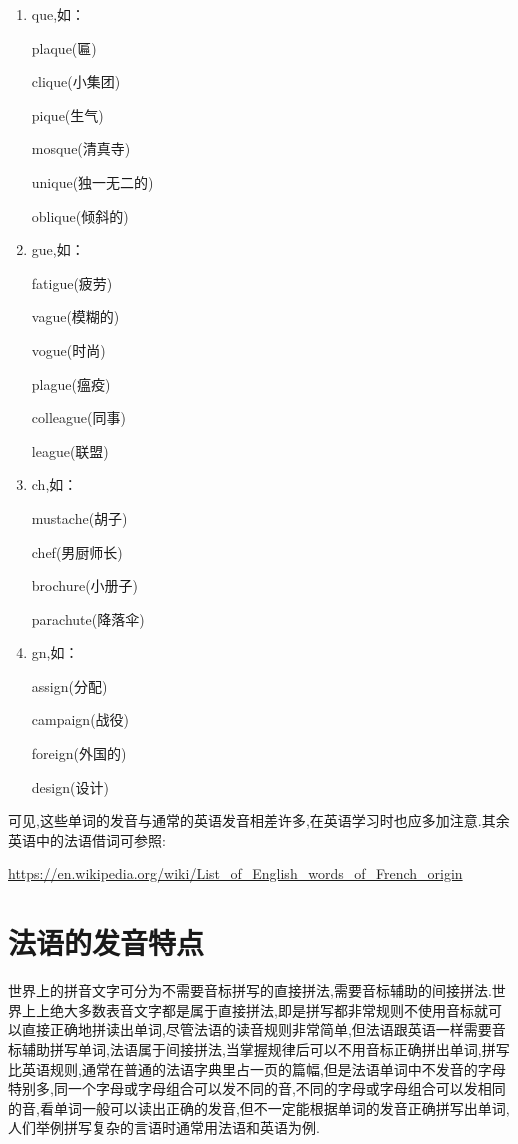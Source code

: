 \begin{multicols}{3}
\begin{enumerate}
		\item que,如：
		
		plaque(匾)

		clique(小集团)
		
		pique(生气)
		
		mosque(清真寺)
		
		unique(独一无二的)
		
		oblique(倾斜的)
		
		\item gue,如：
		
		fatigue(疲劳)

		vague(模糊的)
		
		vogue(时尚)
		
		plague(瘟疫)
		
		colleague(同事)
		
		league(联盟)
		
		\item ch,如：
		
		mustache(胡子)

		chef(男厨师长)
		
		brochure(小册子)
		
		parachute(降落伞)
		
		\item gn,如：
		
		assign(分配)

		campaign(战役)
		
		foreign(外国的)
		
		design(设计)
	\end{enumerate}
\end{multicols}
	
可见,这些单词的发音与通常的英语发音相差许多,在英语学习时也应多加注意.其余英语中的法语借词可参照:

\url{https://en.wikipedia.org/wiki/List_of_English_words_of_French_origin}

\section{法语的发音特点}

世界上的拼音文字可分为不需要音标拼写的直接拼法,需要音标辅助的间接拼法.世界上上绝大多数表音文字都是属于直接拼法,即是拼写都非常规则不使用音标就可以直接正确地拼读出单词,尽管法语的读音规则非常简单,但法语跟英语一样需要音标辅助拼写单词,法语属于间接拼法,当掌握规律后可以不用音标正确拼出单词,拼写比英语规则,通常在普通的法语字典里占一页的篇幅,但是法语单词中不发音的字母特别多,同一个字母或字母组合可以发不同的音,不同的字母或字母组合可以发相同的音,看单词一般可以读出正确的发音,但不一定能根据单词的发音正确拼写出单词,人们举例拼写复杂的言语时通常用法语和英语为例.

